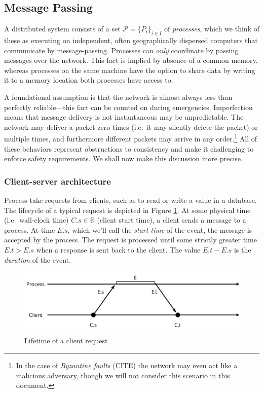 \documentclass[]             %
{NASA}                       %
\theoremstyle{definition}
\begin{document}
\subsection{Message Passing}\label{message-passing}

A distributed system consists of a set
\(\mathcal{P} = \{P_i\}_{i\in I}\) of \emph{processes}, which we think
of these as executing on independent, often geographically dispersed
computers that communicate by message-passing. Processes can \emph{only}
coordinate by passing messages over the network. This fact is implied by
absence of a common memory, whereas processes on the same machine have
the option to share data by writing it to a memory location both
processes have access to.

A foundational assumption is that the network is almost always less than
perfectly reliable---this fact can be counted on during emergencies.
Imperfection means that message delivery is not instantaneous may be
unpredictable. The network may deliver a packet zero times (i.e.~it may
silently delete the packet) or multiple times, and furthermore different
packets may arrive in any order.\footnote{In the case of \emph{Byzantine
  faults} (CITE) the network may even act like a malicious adversary,
  though we will not consider this scenario in this document.} All of
these behaviors represent obstructions to consistency and make it
challenging to enforce safety requirements. We shall now make this
discussion more precise.

\hypertarget{client-server-architecture}{%
\subsubsection{Client-server
architecture}\label{client-server-architecture}}

Process take requests from clients, such as to read or write a value in
a database. The lifecycle of a typical request is depicted in Figure
\ref{fig:request}. At some physical time (i.e.~wall-clock time)
\(C.s \in \mathbb{R}\) (client start time), a client sends a message to
a process. At time \(E.s\), which we'll call the \emph{start time} of
the event, the message is accepted by the process. The request is
processed until some strictly greater time \(E.t > E.s\) when a response
is sent back to the client. The value \(E.t - E.s\) is the
\emph{duration} of the event.

\begin{figure}[h]
  \center
  \includegraphics[scale=0.4]{images/request.png}
  \caption{Lifetime of a client request}
  \label{fig:request}
\end{figure}
\end{document}
